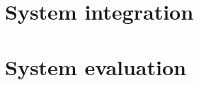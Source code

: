 

\section{System integration}
  \label{sec:system_integration}
  

\section{System evaluation}
  \label{sec:system_evaluation}
  